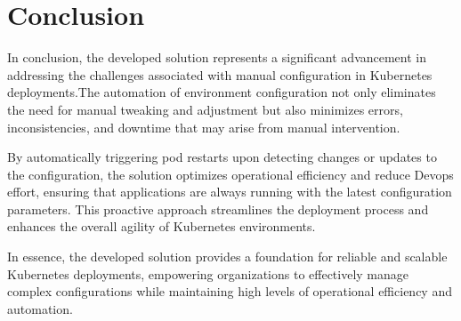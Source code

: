 \section{Conclusion}

In conclusion, the developed solution represents a significant advancement in addressing the challenges associated with manual configuration in Kubernetes deployments.The automation of environment configuration not only eliminates the need for manual tweaking and adjustment but also minimizes errors, inconsistencies, and downtime that may arise from manual intervention.

By automatically triggering pod restarts upon detecting changes or updates to the configuration, the solution optimizes operational efficiency and reduce Devops effort, ensuring that applications are always running with the latest configuration parameters. This proactive approach streamlines the deployment process and enhances the overall agility of Kubernetes environments.

In essence, the developed solution provides a foundation for reliable and scalable Kubernetes deployments, empowering organizations to effectively manage complex configurations while maintaining high levels of operational efficiency and automation.
